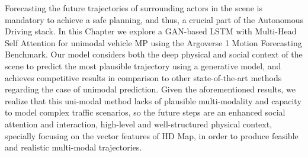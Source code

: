 Forecasting the future trajectories of surrounding actors in the scene is mandatory to achieve a safe planning, and thus, a crucial part of the Autonomous Driving stack. In this Chapter we explore a \ac{GAN}-based \ac{LSTM} with Multi-Head Self Attention for unimodal vehicle \ac{MP} using the Argoverse 1 Motion Forecasting Benchmark. Our model considers both the deep physical and social context of the scene to predict the most plausible trajectory using a generative model, and achieves competitive results in comparison to other state-of-the-art methods regarding the case of unimodal prediction. Given the aforementioned results, we realize that this uni-modal method lacks of plausible multi-modality and capacity to model complex traffic scenarios, so the future steps are an enhanced social attention and interaction, high-level and well-structured physical context, specially focusing on the vector features of HD Map, in order to produce feasible and realistic multi-modal trajectories.